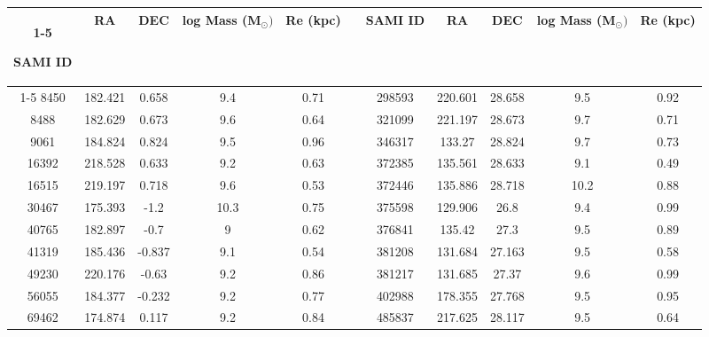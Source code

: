 \documentclass[a4paper,fleqn,usenatbib]{mnras}
\begin{document}
\begin{table*}

\caption{Observational sample of galaxies with stellar masses greater than $10^{9}M_{\odot}$ and effective radius $R_{e}$ < 1 kpc.}
\centering
\begin{tabular}{ccccclccccc}
\cline{1-5}
\cline{7-11}

   SAMI ID &      RA &    DEC &   log Mass (M$_{\odot})$ &   Re (kpc) &             &   SAMI ID &      RA &    DEC &   log Mass (M$_{\odot})$ &   Re (kpc) \\
\cline{1-5}
\cline{7-11}
      8450 & 182.421 &  0.658 &                    9.4 &       0.71 &     &    298593 & 220.601 & 28.658 &                    9.5 &       0.92 \\
      8488 & 182.629 &  0.673 &                    9.6 &       0.64 &     &    321099 & 221.197 & 28.673 &                    9.7 &       0.71 \\
      9061 & 184.824 &  0.824 &                    9.5 &       0.96 &     &    346317 & 133.27  & 28.824 &                    9.7 &       0.73 \\
     16392 & 218.528 &  0.633 &                    9.2 &       0.63 &     &    372385 & 135.561 & 28.633 &                    9.1 &       0.49 \\
     16515 & 219.197 &  0.718 &                    9.6 &       0.53 &     &    372446 & 135.886 & 28.718 &                   10.2 &       0.88 \\
     30467 & 175.393 & -1.2   &                   10.3 &       0.75 &     &    375598 & 129.906 & 26.8   &                    9.4 &       0.99 \\
     40765 & 182.897 & -0.7   &                    9   &       0.62 &     &    376841 & 135.42  & 27.3   &                    9.5 &       0.89 \\
     41319 & 185.436 & -0.837 &                    9.1 &       0.54 &     &    381208 & 131.684 & 27.163 &                    9.5 &       0.58 \\
     49230 & 220.176 & -0.63  &                    9.2 &       0.86 &     &    381217 & 131.685 & 27.37  &                    9.6 &       0.99 \\
     56055 & 184.377 & -0.232 &                    9.2 &       0.77 &     &    402988 & 178.355 & 27.768 &                    9.5 &       0.95 \\
     69462 & 174.874 &  0.117 &                    9.2 &       0.84 &     &    485837 & 217.625 & 28.117 &                    9.5 &       0.64 \\

\end{tabular}
\end{table*}
\end{document}
